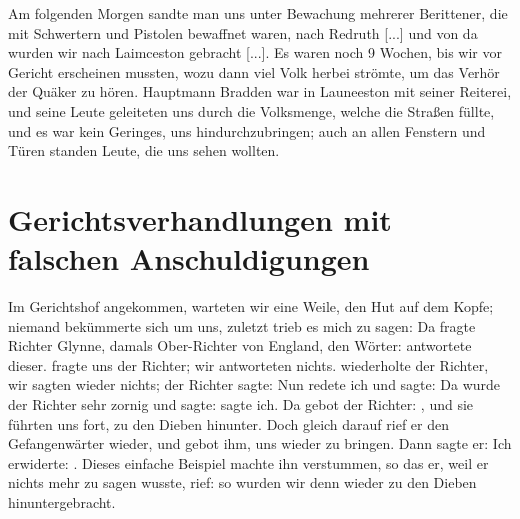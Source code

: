 Am folgenden Morgen sandte
man uns unter Bewachung mehrerer Berittener, die mit Schwertern
und Pistolen bewaffnet waren, nach Redruth [...] und von da
wurden wir nach Laimceston gebracht [...].
Es waren noch 9 Wochen, bis wir vor Gericht erscheinen
mussten, wozu dann viel Volk herbei strömte, um das Verhör der
Quäker zu hören. Hauptmann Bradden war in Launeeston mit
seiner Reiterei, und seine Leute geleiteten uns durch die 
Volksmenge, welche die Straßen füllte, und es war kein Geringes, uns
hindurchzubringen; auch an allen Fenstern und Türen standen
Leute, die uns sehen wollten. 

\section{Gerichtsverhandlungen mit falschen Anschuldigungen}

Im Gerichtshof angekommen,
warteten wir eine Weile, den Hut auf dem Kopfe; niemand 
bekümmerte sich um uns, zuletzt trieb es mich zu sagen: 
 Da fragte Richter Glynne, 
damals Ober-Richter
von England, den Wörter:   
antwortete dieser.  fragte
uns der Richter; wir antworteten nichts.  wiederholte der Richter, wir sagten wieder nichts; der
Richter sagte: 
Nun redete ich und sagte: 
Da wurde der Richter sehr zornig und sagte:  
sagte ich. Da gebot der Richter: , und sie führten uns fort, zu den Dieben hinunter.
Doch gleich darauf rief er den Gefangenwärter wieder, und
gebot ihm, uns wieder zu bringen. Dann sagte er:  Ich erwiderte:
. Dieses 
einfache Beispiel machte ihn verstummen,
so das er, weil er nichts mehr zu sagen wusste, rief: 
 so wurden wir denn 
wieder zu den Dieben hinuntergebracht. 


